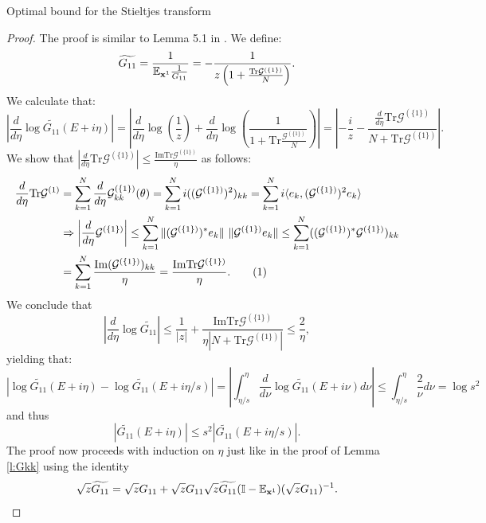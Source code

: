 \documentclass[11pt, a4paper, oneside]{book}
\numberwithin{equation}{chapter}
\newcommand{\E}{\mathbb E}
\newcommand{\Tr}{\mathrm{Tr}}
\newcommand{\xx}{{\bf x}}
\newcommand\numberthis{\addtocounter{equation}{1}\tag{\theequation}}
\begin{document}
\begin{section}{Optimal bound for the Stieltjes transform}
\begin{proof}
The proof is similar to Lemma 5.1 in \cite{cacciapuoti2015bounds}.
We define:
$$\widetilde{G_{11}}=\frac{1}{\E_{\xx^1} \frac{1}{G_{11}}}= - \frac{1}{ z \left (1+\frac{\Tr\mathcal{G}^{(\{1\})}}{N} \right )}. $$
%
We calculate that: 
$$ \left| \frac{d}{d\eta} \log \widetilde{G_{11}}(E+i\eta) \right|= \left| \frac{d}{d\eta} \log \left(\frac{1}{z} \right) + \frac{d}{d\eta} \log \left ( \frac{1}{1+ \Tr \frac{\mathcal{G}^{(\{1\})}}{N}} \right ) \right|
=
 \left| - \frac{i}{z} - \frac{\frac{d}{d\eta}\Tr\mathcal{G}^{(\{1\}) } }{N+\Tr\mathcal{G}^{(\{1\}) }} \right| .$$
%
We show that $ \left | \frac{d}{d\eta} \Tr\mathcal{G}^{(\{1\}) } \right | \leq \frac{\mathrm{Im} \Tr\mathcal{G}^{(\{1\}) }}{\eta} $ as follows:
%
\begin{align*}
\frac{d}{d\eta} \Tr \mathcal{G}^{(1)} &= \sum \limits_{k=1}^N \frac{d}{d\eta} \mathcal{G}^{(\{1\})}_{kk}(\theta) = \sum \limits_{k=1}^N i  ((\mathcal{G}^{(\{1\})})^{2})_{kk}= \sum \limits_{k=1}^N i \langle e_k, (\mathcal{G}^{(\{1\})})^2 e_k \rangle
\\
 &\Rightarrow  \left | \frac{d}{d\eta} \mathcal{G}^{(\{1\})} \right | \leq \sum \limits_{k=1}^N \| (\mathcal{G}^{(\{1\})})^* e_k \| \ \| \mathcal{G}^{(\{1\})} e_k \| \leq \sum \limits_{k=1}^N ( (\mathcal{G}^{(\{1\})})^*\mathcal{G}^{(\{1\})} )_{kk} 
 \\
 &= \sum \limits_{k=1}^N \frac{\mathrm{Im} (\mathcal{G}^{(\{1\})})_{kk}}{\eta} = \frac{\mathrm{Im} \Tr \mathcal{G}^{(\{1\})}}{\eta} . \numberthis
 \end{align*}
We conclude that
\begin{equation}  \left | \frac{d}{d\eta} \log \widetilde{G_{11}} \right | \leq \frac{1}{|z|} + \frac{\mathrm{Im} \Tr\mathcal{G}^{(\{1\})}}{\eta |N+\Tr\mathcal{G}^{(\{1\})}|} \leq \frac{2}{\eta} ,
\end{equation}
%
yielding that:
%
\begin{equation} \left |\log \widetilde{G_{11}}(E+i\eta) - \log \widetilde{G_{11}}(E+i\eta/s) \right |= \left | \int_{\eta/s}^{\eta} \frac{d}{d\nu} \log \widetilde{G_{11}}(E+i\nu) d\nu \right | \leq \int_{\eta/s}^{\eta} \frac{2}{\nu} d\nu = \log s^2 \end{equation}
%
and thus $$| \widetilde{G_{11}}(E+i\eta) | \leq s^2 | \widetilde{G_{11}}(E+i\eta/s ) | .$$
%
The proof now proceeds with induction on $\eta$ just like in the proof of Lemma \ref{l:Gkk} using the identity
%
\begin{equation}\label{e:tildeGkk}\sqrt{z}\widetilde{G_{11}} = \sqrt{z} G_{11} + \sqrt{z} G_{11} \sqrt{z} \widetilde{G_{11}} (\mathbb{I}-\E_{\xx^1} ) (\sqrt z G_{11})^{-1} .

\end{equation}
\end{proof}
\end{section}
\end{document}
